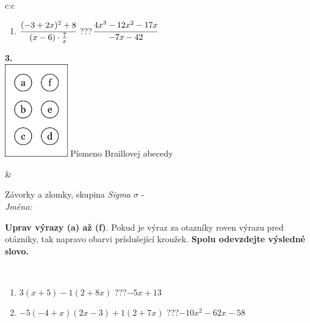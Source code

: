 \documentclass[10pt]{report}
\begin{document}
\begin{tabular}{c:c}
\begin{minipage}[c][104.5mm][t]{0.5\linewidth}
\begin{center}
\begin{minipage}{0.79\linewidth}
\begin{center}
\begin{varwidth}{\linewidth}
\begin{enumerate}
\item $\cfrac{(-3+2x)^2+8}{(x-6)\cdot\frac{7}{x}}$\quad \dotfill\; ???\;\dotfill \quad $\cfrac{4x^3-12x^2-17x}{-7x-42}$
\end{enumerate}
\end{varwidth}
\end{center}
\end{minipage}
\begin{minipage}{0.20\linewidth}
\begin{center}
{\Huge\bfseries 3.} \\[2mm]
\includegraphics[height=40mm]{../images/braille.png}
{\small Písmeno Braillovej abecedy}
\end{center}
\end{minipage}
\end{center}
\end{minipage}
&
\begin{minipage}[c][104.5mm][t]{0.5\linewidth}
\begin{center}
\vspace{7mm}
{\huge Závorky a zlomky, skupina \textit{Sigma $\sigma$} -}\\[5mm]
\textit{Jméno:}\phantom{xxxxxxxxxxxxxxxxxxxxxxxxxxxxxxxxxxxxxxxxxxxxxxxxxxxxxxxxxxxxxxxxx}\\[5mm]
\begin{minipage}{0.95\linewidth}
\begin{center}
\textbf{Uprav výrazy (a) až (f)}. Pokud je výraz za otazníky roven výrazu pred otázniky, tak napravo obarvi príslušející kroužek. \textbf{Spolu odevzdejte výsledné slovo.}
\end{center}
\end{minipage}
\\[1mm]
\begin{minipage}{0.79\linewidth}
\begin{center}
\begin{varwidth}{\linewidth}
\begin{enumerate}
\normalsize
\item $3(x+5)-1(2+8x)$\quad \dotfill\; ???\;\dotfill \quad $-5x+13$
\item $-5(-4+x)(2x-3)+1(2+7x)$\quad \dotfill\; ???\;\dotfill \quad $-10x^2-62x-58$

\end{enumerate}
\end{varwidth}
\end{center}
\end{minipage}
\end{center}
\end{minipage}
\end{tabular}
\end{document}
